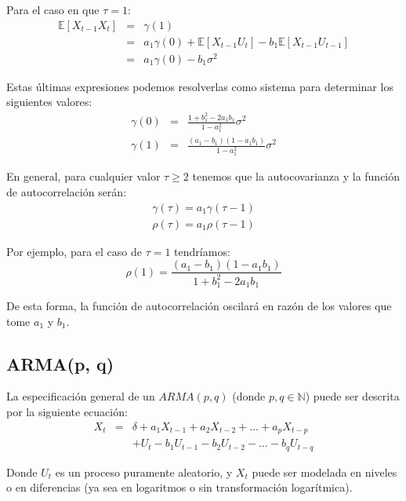 \documentclass[
]{book}
\begin{document}
Para el caso en que \(\tau = 1\): \begin{eqnarray}
    \mathbb{E}[X_{t-1} X_t] & = & \gamma(1) \nonumber \\
    & = & a_1 \gamma(0) + \mathbb{E}[X_{t-1} U_t] - b_1 \mathbb{E}[X_{t-1} U_{t-1}] \nonumber \\
    & = & a_1 \gamma(0) - b_1 \sigma^2
\end{eqnarray}

Estas últimas expresiones podemos resolverlas como sistema para determinar los siguientes valores:
\begin{eqnarray}
    \gamma(0) & = & \frac{1 + b_1^2 - 2 a_1 b_1}{1 - a_1^2} \sigma^2 \\
    \gamma(1) & = & \frac{(a_1 - b_1)(1 - a_1 b_1)}{1 - a_1^2} \sigma^2
\end{eqnarray}

En general, para cualquier valor \(\tau \geq 2\) tenemos que la autocovarianza y la función de autocorrelación serán:
\begin{eqnarray}
    \gamma(\tau) = a_1 \gamma(\tau - 1) \\
    \rho(\tau) = a_1 \rho(\tau - 1)
\end{eqnarray}

Por ejemplo, para el caso de \(\tau = 1\) tendríamos:
\begin{equation}
    \rho(1) = \frac{(a_1 - b_1)(1 - a_1 b_1)}{1 + b_1^2 - 2 a_1 b_1}
\end{equation}

De esta forma, la función de autocorrelación oscilará en razón de los valores que tome \(a_1\) y \(b_1\).

\hypertarget{armap-q}{%
\subsection{ARMA(p, q)}\label{armap-q}}

La especificación general de un \(ARMA(p, q)\) (donde \(p, q \in \mathbb{N}\)) puede ser descrita por la siguiente ecuación:
\begin{eqnarray}
    X_t & = & \delta + a_1 X_{t - 1} + a_2 X_{t - 2} + \ldots + a_p X_{t - p} \nonumber \\
    &   & + U_t - b_1 U_{t - 1} - b_2  U_{t - 2} - \ldots - b_q  U_{t - q}
    \label{eq:ARMApqEq}
\end{eqnarray}

Donde \(U_t\) es un proceso puramente aleatorio, y \(X_t\) puede ser modelada en niveles o en diferencias (ya sea en logaritmos o sin transformación logarítmica).
\end{document}
